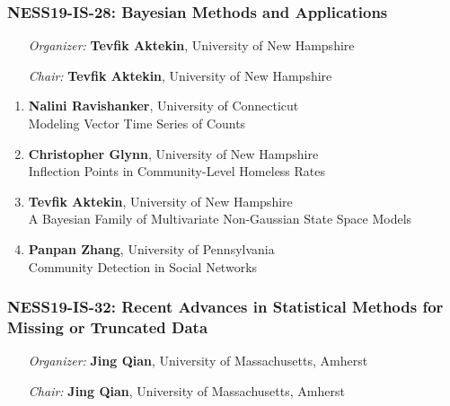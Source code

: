 \subsubsection*{NESS19-IS-28: Bayesian Methods and Applications}

\begin{enumerate}[align=left]
\item [\emph{Organizer:}] \textbf{Tevfik Aktekin}, University of New Hampshire \\
\item [\emph{Chair:}] \textbf{Tevfik Aktekin}, University of New Hampshire
\end{enumerate}

\begin{enumerate}
\item \textbf{Nalini Ravishanker}, University of Connecticut \\
Modeling Vector Time Series of Counts
\item \textbf{Christopher Glynn}, University of New Hampshire \\
Inflection Points in Community-Level Homeless Rates
\item \textbf{Tevfik Aktekin}, University of New Hampshire \\
A Bayesian Family of Multivariate Non-Gaussian State Space Models
\item \textbf{Panpan Zhang}, University of Pennsylvania \\
Community Detection in Social Networks
\end{enumerate}

\subsubsection*{NESS19-IS-32: Recent Advances in Statistical Methods for Missing or Truncated Data}

\begin{enumerate}[align=left]
\item [\emph{Organizer:}] \textbf{Jing Qian}, University of Massachusetts, Amherst \\
\item [\emph{Chair:}] \textbf{Jing Qian}, University of Massachusetts, Amherst
\end{enumerate}

